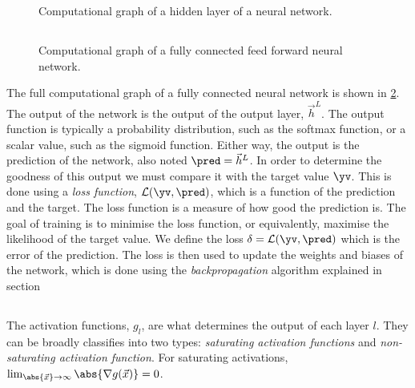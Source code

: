         \begin{figure}[h!]
            \centering
            
            \caption{Computational graph of a hidden layer of a neural network.}
            \label{fig:ML:NN:comp_graph_hl}
        \end{figure}

    \subsection{}
        \begin{figure}[h!]
            \centering
            
            \caption{Computational graph of a fully connected feed forward neural network.}
            \label{fig:ML:NN:comp_graph_whole_FFNN}
        \end{figure}
        The full computational graph of a fully connected neural network is shown in \cref{fig:ML:NN:comp_graph_whole_FFNN}. The output of the network is the output of the output layer, $\vec{h}^L$. The output function is typically a probability distribution, such as the softmax function, or a scalar value, such as the sigmoid function. Either way, the output is the prediction of the network, also noted $\pred = \vec{h}^L$. In order to determine the goodness of this output we must compare it with the target value $\yv$. This is done using a \textit{loss function}, $\mathcal{L}(\yv, \pred)$, which is a function of the prediction and the target. The loss function is a measure of how good the prediction is. The goal of training is to minimise the loss function, or equivalently, maximise the likelihood of the target value. We define the loss $\delta=\mathcal{L}(\yv, \pred)$ which is the error of the prediction. The loss is then used to update the weights and biases of the network, which is done using the \textit{backpropagation} algorithm explained in section 


    \subsection{}
        The activation functions, $g_l$, are what determines the output of each layer $l$. They can be broadly classifies into two types: \textit{saturating activation functions} and \textit{non-saturating activation function}. For saturating activations, $\lim_{\abs{\vec{x}}\to\infty}\abs{\nabla g(\vec{x})} = 0$. 
